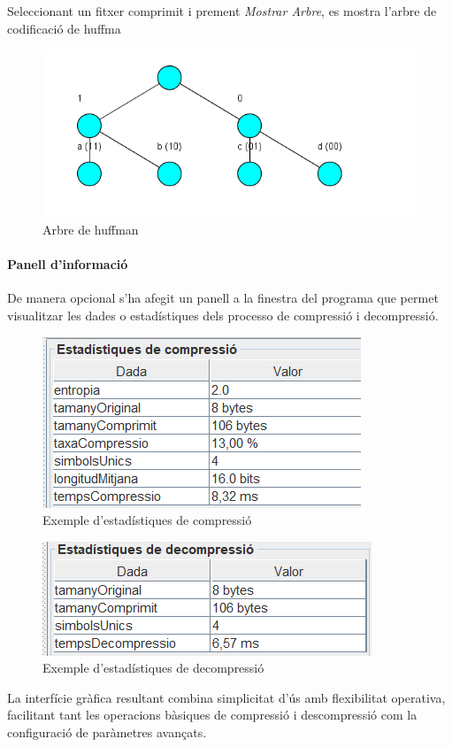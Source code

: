 \documentclass{ieeetj}
\begin{document}
Seleccionant un fitxer comprimit i prement \emph{Mostrar Arbre}, es mostra l'arbre de codificació de huffma
\begin{figure}[H]
    \centering
    \includegraphics[width=0.5\linewidth]{png/arbre.png}
    \caption{Arbre de huffman}
    \label{fig:enter-label}
\end{figure}
\vspace{1em}

\paragraph{Panell d'informació}
De manera opcional s'ha afegit un panell a la finestra del programa que permet visualitzar les dades o estadístiques dels processo de compressió i decompressió. 

\begin{figure}[H]
    \centering
    \includegraphics[width=0.5\linewidth]{png/estdCompressio.png}
    \caption{Exemple d'estadístiques de compressió}
    \label{fig:enter-label}
\end{figure}

\begin{figure}[H]
    \centering
    \includegraphics[width=0.5\linewidth]{png/estdDecompressio.png}
    \caption{Exemple d'estadístiques de decompressió}
    \label{fig:enter-label}
\end{figure}

La interfície gràfica resultant combina simplicitat d'ús amb flexibilitat operativa, facilitant tant les operacions bàsiques de compressió i descompressió com la configuració de paràmetres avançats.
\end{document}
